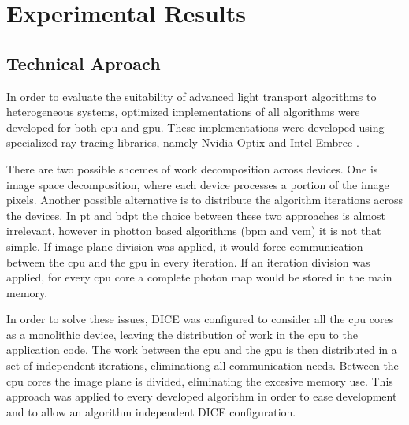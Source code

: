 \chapter{Experimental Results}

\section{Technical Aproach}

In order to evaluate the suitability of advanced light transport algorithms to heterogeneous systems, optimized implementations of all algorithms were developed for both \gls{cpu} and \gls{gpu}. These implementations were developed using specialized ray tracing libraries, namely Nvidia Optix \citep{parker2010optix} and Intel Embree \citep{wald2014embree}.


There are two possible shcemes of work decomposition across devices. One is image space decomposition, where each device processes a portion of the image pixels. Another possible alternative is to distribute the algorithm iterations across the devices. In \gls{pt} and \gls{bdpt} the choice between these two approaches is almost irrelevant, however in photton based algorithms (\gls{bpm} and \gls{vcm}) it is not that simple. If image plane division was applied, it would force communication between the \gls{cpu} and the \gls{gpu} in every iteration. If an iteration division was applied, for every \gls{cpu} core a complete photon map would be stored in the main memory.

In order to solve these issues, DICE was configured to consider all the \gls{cpu} cores as a monolithic device, leaving the distribution of work in the \gls{cpu} to the application code. The work between the \gls{cpu} and the \gls{gpu} is then distributed in a set of independent iterations, eliminationg all communication needs. Between the \gls{cpu} cores the image plane is divided, eliminating the excesive memory use. This approach was applied to every developed algorithm in order to ease development and to allow an algorithm independent DICE configuration.





